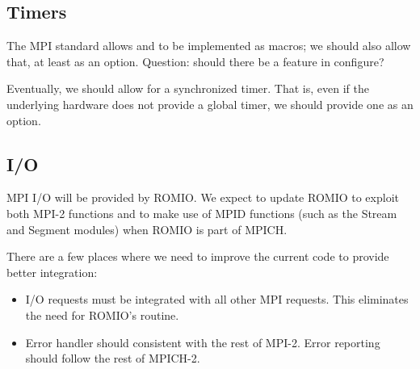 \documentclass{article}
\begin{document}
\subsubsection{}


\subsection{Timers}
The MPI standard allows  and  to be
implemented as macros; we should also allow that, at least as an
option.  Question:  should there be a
 feature in
configure?

Eventually, we should allow for a synchronized timer.  That is, even
if the underlying hardware does not provide a global timer, we should
provide one as an option.

\subsubsection{}
\subsubsection{}

\subsection{I/O}
MPI I/O will be provided by ROMIO.  We expect to update ROMIO to exploit both
MPI-2 functions and to make use of MPID functions (such as the Stream and
Segment modules) when ROMIO is part of MPICH.

There are a few places where we need to improve the current code to provide
better integration:
\begin{itemize}
\item I/O requests must be integrated with all other MPI requests.  This
  eliminates the need for ROMIO's  routine.
\item Error handler should consistent with the rest of MPI-2.  Error reporting
  should follow the rest of MPICH-2.
\end{itemize}
\end{document}
